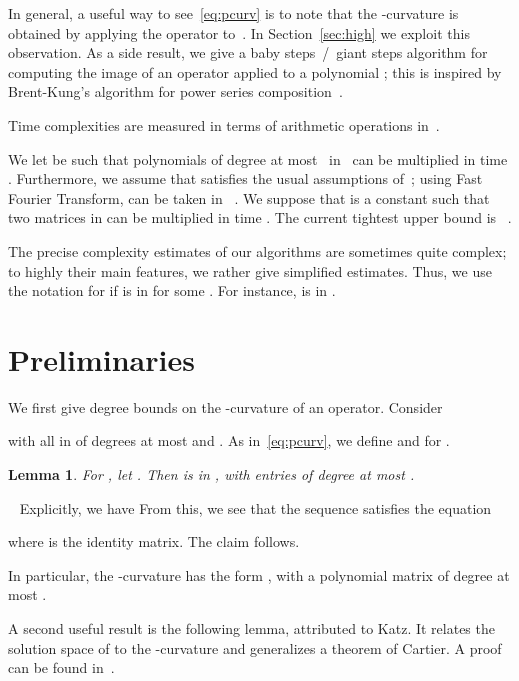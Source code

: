 \documentclass{sig-alternate}
\def\myproof{\noindent{\sc Proof.}~}
\def\foorp{\hfill}
\newtheorem{Lemma}{Lemma}
\begin{document}
In general, a useful way to see~\eqref{eq:pcurv} is to note that the
-curvature is obtained by applying the operator
 to~. In Section~\ref{sec:high} we exploit
this observation. As a side result, we give a baby steps~/~giant steps
algorithm for computing the image  of an operator  applied to a
polynomial ; this is inspired by Brent-Kung's algorithm for power
series composition~\cite{BrKu78}.

\smallskip{} Time complexities are
measured in terms of arithmetic operations in~. 

We let  be such that polynomials of degree at
most~ in~ can be multiplied in time . Furthermore,
we assume that  satisfies the usual assumptions
of~\cite[\S8.3]{GaGe99}; using Fast Fourier Transform,  can be
taken in ~\cite{ScSt71,CaKa91}.  We suppose
that  is a constant such that two matrices in
 can be multiplied in time . The
current tightest upper bound is ~\cite{CoWi90}.

The precise complexity estimates of our algorithms are sometimes
quite complex; to highly their main features, we rather give
simplified estimates. Thus, we use the notation 
for  if  is in  for some
. For instance,  is in .



\section{Preliminaries}

We first give degree bounds on the -curvature of an operator.
Consider 

with all  in  of degrees at most  and . As in~\eqref{eq:pcurv}, we define  and  for .
\begin{Lemma}\label{lemma:1}
  For , let . Then  is in
  , with entries of degree at most .
\end{Lemma}
\myproof
Explicitly, we have
 From this, we see that the sequence 
satisfies the equation

where  is the  identity matrix. The claim
follows.  \foorp

\smallskip\noindent In particular, the -curvature  has
the form , with  a polynomial matrix of degree
at most .



A second useful result is the following lemma, attributed to Katz. It
relates the solution space of  to the -curvature and
generalizes a theorem of Cartier.  A proof can be found
in~\cite[Th.~3.8]{Cluzeau03}.
\end{document}
